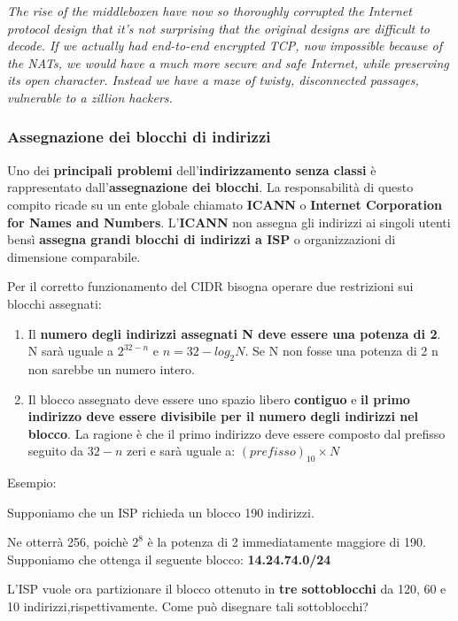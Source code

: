 \documentclass[11pt,a4paper,oneside]{book}
\theoremstyle{definition}
\begin{document}
\textit{The rise of the middleboxen have now so thoroughly corrupted the
	Internet protocol design that it's not surprising that the original
	designs are difficult to decode.   If we actually had end-to-end
	encrypted TCP, now impossible because of the NATs, we would have a much
	more secure and safe Internet, while preserving its open character.
	Instead we have a maze of twisty, disconnected passages, vulnerable to a
	zillion hackers.}

\pagebreak

\subsubsection{Assegnazione dei blocchi di indirizzi}
Uno dei \textbf{principali problemi} dell'\textbf{indirizzamento senza classi} è rappresentato dall'\textbf{assegnazione dei blocchi}. La responsabilità di questo compito ricade su un ente globale chiamato \textbf{ICANN} o \textbf{Internet Corporation for Names and Numbers}. L'\textbf{ICANN} non assegna gli indirizzi ai singoli utenti bensì \textbf{assegna grandi blocchi di indirizzi a ISP} o organizzazioni di dimensione comparabile.

Per il corretto funzionamento del CIDR bisogna operare due restrizioni sui blocchi assegnati:
\begin{enumerate}
	\item Il \textbf{numero degli indirizzi assegnati N deve essere una potenza di 2}. N sarà uguale a $2^{32 - n}$ e $n = 32 - log_{2}N$. Se N non fosse una potenza di 2 n non sarebbe un numero intero.
	\item Il blocco assegnato deve essere uno spazio libero \textbf{contiguo} e \textbf{il primo indirizzo deve essere divisibile per il numero degli indirizzi nel blocco}. La ragione è che il primo indirizzo deve essere composto dal prefisso seguito da $32 - n$ zeri e sarà uguale a: $(prefisso)_{10} \times N$
\end{enumerate}
Esempio:

Supponiamo che un ISP richieda un blocco 190 indirizzi.

Ne otterrà 256, poichè $2^{8}$ è la potenza di 2 immediatamente maggiore di 190.
Supponiamo che ottenga il seguente blocco: \textbf{14.24.74.0/24}

L'ISP vuole ora partizionare il blocco ottenuto in \textbf{tre sottoblocchi} da 120, 60 e 10 indirizzi,rispettivamente. Come può disegnare tali sottoblocchi?
\end{document}
